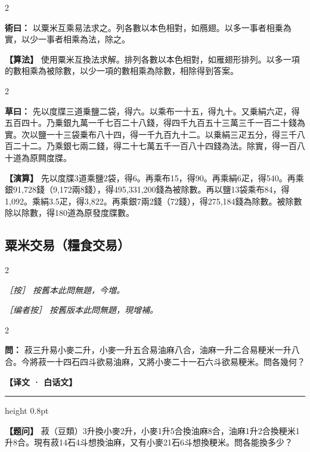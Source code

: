 \documentclass[11pt,a4paper]{article}
\newcommand{\ClassicalQuestion}[1]{\par\noindent\textbf{\color{problemcolor}問：}#1\par}
\newcommand{\ClassicalMethod}[1]{\par\noindent\textbf{\color{methodcolor}術曰：}#1\par}
\newcommand{\ClassicalWorking}[1]{\par\noindent\textbf{草曰：}#1\par}
\newcommand{\ClassicalNote}[1]{\par\noindent\textit{［按］#1}\par}
\newcommand{\ModernQuestion}[1]{\par\noindent\textbf{\color{modernlabel}【题问】}#1\par}
\newcommand{\ModernMethod}[1]{\par\noindent\textbf{\color{methodcolor}【算法】}#1\par}
\newcommand{\ModernWorking}[1]{\par\noindent\textbf{【演算】}#1\par}
\newcommand{\ModernNote}[1]{\par\noindent\textit{\color{notecolor}［编者按］#1}\par}
\newcommand{\ModernHeader}{%
  \begin{center}\textbf{\color{headermodern}【译文 · 白话文】}\end{center}
  \vspace{-0.5em}
  \hrule height 0.8pt
  \vspace{0.5em}
}
\begin{document}
\begin{paracol}{2}

\ClassicalMethod{%
以粟米互乘易法求之。列各數以本色相對，如鴈翅。以多一事者相乗為實，以少一事者相乘為法，除之。}

\switchcolumn

\ModernMethod{%
使用粟米互換法求解。排列各數以本色相對，如雁翅形排列。以多一項的數相乘為被除數，以少一項的數相乘為除數，相除得到答案。
}

\end{paracol}

\begin{paracol}{2}

\ClassicalWorking{%
先以度牒三道乗鹽二袋，得六。以乘布一十五，得九十。又乗絹六疋，得五百四十。乃乗銀九萬一千七百二十八錢，得四千九百五十三萬三千一百二十錢為實。次以鹽一十三袋乗布八十四，得一千九百九十二。以乗絹三疋五分，得三千八百二十二。乃乘銀七兩二錢，得二十七萬五千一百八十四錢為法。除實，得一百八十道為原闗度牒。}

\switchcolumn

\ModernWorking{%
先以度牒3道乘鹽2袋，得6。再乘布15，得90。再乘絹6疋，得540。再乘銀91,728錢（9,172兩8錢），得495,331,200錢為被除數。再以鹽13袋乘布84，得1,092。乘絹3.5疋，得3,822。再乘銀7兩2錢（72錢），得275,184錢為除數。被除數除以除數，得180道為原發度牒數。
}

\end{paracol}

\subsection*{\color{sectioncolor}粟米交易（糧食交易）}

\begin{paracol}{2}

\ClassicalNote{%
按舊本此問無題，今増。}

\switchcolumn

\ModernNote{%
按舊版本此問無題，現增補。
}

\end{paracol}

\begin{paracol}{2}

\ClassicalQuestion{%
菽三升易小麥二升，小麥一升五合易油麻八合，油麻一升二合易粳米一升八合。今將菽一十四石四斗欲易油麻，又將小麥二十一石六斗欲易粳米。問各幾何？}

\switchcolumn

\ModernHeader

\ModernQuestion{%
菽（豆類）3升換小麥2升，小麥1升5合換油麻8合，油麻1升2合換粳米1升8合。現有菽14石4斗想換油麻，又有小麥21石6斗想換粳米。問各能換多少？
}

\end{paracol}
\end{document}
